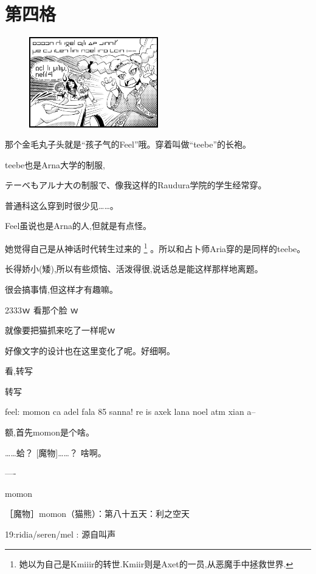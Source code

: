 \chapter{第四格}

\begin{figure}[H]
\includegraphics[width=0.5\textwidth]{ARKA/uni4.png}%
\end{figure}


那个金毛丸子头就是``孩子气的Feel''哦。穿着叫做``teebe''的长袍。


teebe也是Arna大学的制服,

テーベもアルナ大の制服で、像我这样的Raudura学院的学生经常穿。

普通科这么穿到时很少见……。


Feel虽说也是Arna的人,但就是有点怪。

她觉得自己是从神话时代转生过来的
\footnote{她以为自己是Kmiiir的转世.Kmiir则是Axet的一员,从恶魔手中拯救世界.}
。所以和占卜师Aria穿的是同样的teebe。

长得娇小(矮),所以有些烦恼、活泼得很,说话总是能这样那样地离题。

很会搞事情,但这样才有趣嘛。


2333ｗ  看那个脸 ｗ

就像要把猫抓来吃了一样呢ｗ

好像文字的设计也在这里变化了呢。好细啊。


看,转写

\FiveStar 转写

feel: momon ca adel fala 85 sanna! re is axek lana noel atm xian a--


额,首先momon是个啥。
    
……蛤？  [魔物]……？  啥啊。

----

momon

［魔物］momon（猫熊）：第八十五天：利之空天

19:ridia/seren/mel : 源自叫声

